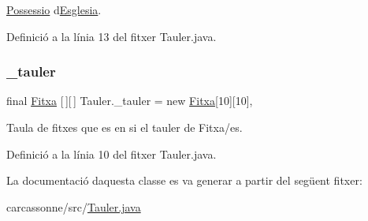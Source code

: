 \mbox{\hyperlink{class_possessio}{Possessio}} d\textquotesingle{}\mbox{\hyperlink{class_esglesia}{Esglesia}}. 



Definició a la línia 13 del fitxer Tauler.\+java.

\mbox{\label{class_tauler_a3972f60c667bd7f84968b078795bf3cb}} 
\subsubsection{\texorpdfstring{\+\_\+tauler}{\_tauler}}
{\footnotesize\ttfamily final \mbox{\hyperlink{class_fitxa}{Fitxa}} \mbox{[}$\,$\mbox{]}\mbox{[}$\,$\mbox{]} Tauler.\+\_\+tauler = new \mbox{\hyperlink{class_fitxa}{Fitxa}}\mbox{[}10\mbox{]}\mbox{[}10\mbox{]}\hspace{0.3cm}{\ttfamily [static]}, {\ttfamily [private]}}



Taula de fitxes que es en si el tauler de Fitxa/es. 



Definició a la línia 10 del fitxer Tauler.\+java.



La documentació d\textquotesingle{}aquesta classe es va generar a partir del següent fitxer\+:\begin{DoxyCompactItemize}
\item 
carcassonne/src/\mbox{\hyperlink{_tauler_8java}{Tauler.\+java}}\end{DoxyCompactItemize}
